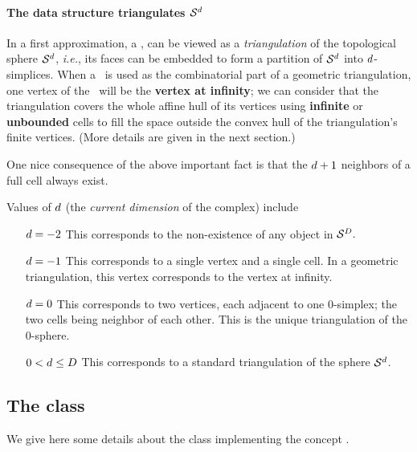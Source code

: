 {{\newcommand{\sphere}{\ensuremath{\mathcal S}}

\paragraph{The data structure triangulates $\sphere^\cd$}

In a first approximation,
a \tds, can be viewed as
a \emph{triangulation} of the topological sphere $\sphere^\cd$,
\emph{i.e.}, its faces can be embedded to form a partition of $\sphere^\cd$ into $d$-simplices. When a
\tds\ is used as the combinatorial part of a geometric triangulation, one
vertex of the \tds\ will be the \textbf{vertex at
infinity}; we can consider that the triangulation covers the whole
affine hull of its vertices
using \textbf{infinite} or \textbf{unbounded} cells to fill the space  outside the convex
hull of the triangulation's finite vertices. (More details are given in the next section.)

One nice consequence of the above important fact is that the $d+1$ neighbors
of a full cell always exist.

Values of $d$ (the \emph{current dimension} of the complex) include
\begin{itemize}
\item[$d=-2$] This corresponds to the non-existence of any object in
$\sphere^\ad.$
\item[$d=-1$] This corresponds to a single vertex and a single cell. In a
geometric triangulation, this vertex corresponds to the vertex at infinity.
\item[$d=0$] This corresponds to two vertices, each adjacent to one $0$-simplex;
the two cells being neighbor of each other. This is the unique
triangulation of the $0$-sphere.
\item[$0<d\le D$] This corresponds to a standard triangulation of
the sphere $\sphere^\cd$.
\end{itemize}


\subsection{The class \label{triangulation:tds:impl}}

We give here some details about the class
implementing the concept .


}}
